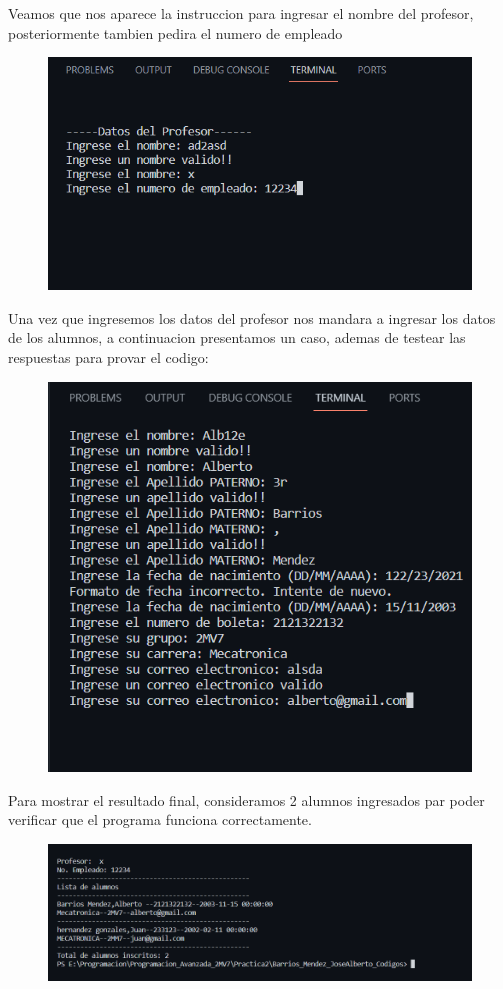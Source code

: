 \documentclass[12pt]{article}
\begin{document}
Veamos que nos aparece la instruccion para ingresar el nombre del profesor, posteriormente tambien pedira  el numero de empleado
\begin{figure}[H]
		\begin{center}
 			\includegraphics[width = .6\textwidth]{14.png}
 			
		\end{center} 
\end{figure}

Una vez que ingresemos los datos del profesor nos mandara a ingresar los datos de los alumnos, a continuacion presentamos un caso, ademas de testear las respuestas para provar el codigo:
\begin{figure}[H]
		\begin{center}
 			\includegraphics[width = .6\textwidth]{15.png}
 			
		\end{center} 
\end{figure}

Para mostrar el resultado final, consideramos 2 alumnos ingresados par poder verificar que el programa funciona correctamente.
\begin{figure}[H]
		\begin{center}
 			\includegraphics[width = .6\textwidth]{16.png}
 			 
 			
		\end{center} 
\end{figure}
\end{document}
